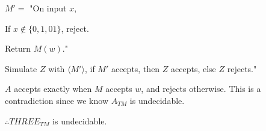 \documentclass[11pt]{article}
\begin{document}
\hspace{30px}$M'=$ "On input $x$,

\hspace{45px}If $x\notin\{0,1,01\}$, reject.

\hspace{45px}Return $M(w)$."

\hspace{30px}Simulate $Z$ with $\langle M'\rangle$, if $M'$ accepts, then $Z$
accepts, else $Z$ rejects."

\vspace{5px}$A$ accepts exactly when $M$ accepts $w$, and rejects otherwise.
This is a contradiction since we know $A_{TM}$ is undecidable.

$\therefore THREE_{TM}$ is undecidable.

\pagebreak
\end{document}
